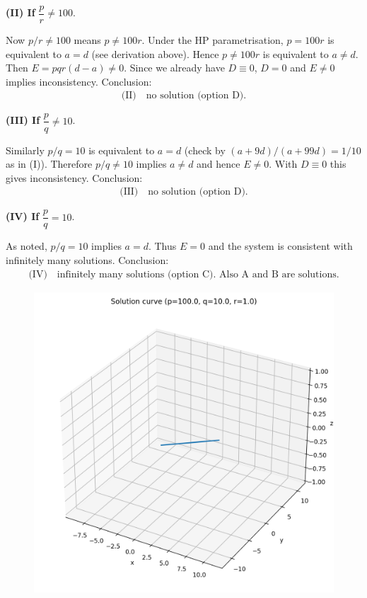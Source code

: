 \documentclass[12pt]{article}
\begin{document}
\noindent\textbf{(II) If } $\dfrac{p}{r}\neq 100$.

Now \(p/r\neq100\) means \(p\neq100r\). Under the HP parametrisation, \(p=100r\) is equivalent to \(a=d\) (see derivation above). Hence \(p\neq100r\) is equivalent to \(a\neq d\). Then \(E = pqr(d-a)\neq0\). Since we already have \(D\equiv0\), \(D=0\) and \(E\neq0\) implies inconsistency. Conclusion:
\begin{align}
\text{(II)}\quad\boxed{\text{no solution (option D).}}
\end{align}



\noindent\textbf{(III) If } $\dfrac{p}{q}\neq 10$.

Similarly \(p/q = 10\) is equivalent to \(a=d\) (check by \((a+9d)/(a+99d)=1/10\) as in (I)). Therefore \(p/q\neq10\) implies \(a\neq d\) and hence \(E\neq0\). With \(D\equiv0\) this gives inconsistency. Conclusion:
\begin{align}
\text{(III)}\quad\boxed{\text{no solution (option D).}}
\end{align}


\noindent\textbf{(IV) If } $\dfrac{p}{q}=10$.

As noted, \(p/q=10\) implies \(a=d\). Thus \(E=0\) and the system is consistent with infinitely many solutions. Conclusion:
\begin{align}
\text{(IV)}\quad\boxed{\text{infinitely many solutions (option C). \ Also A and B are solutions.}}
\end{align}

\begin{figure}[H]
    \centering
    \includegraphics[width=0.9\columnwidth]{figs/hp_3d_only.png}
    \caption{}
    \label{fig:placeholder}
\end{figure}
\end{document}
